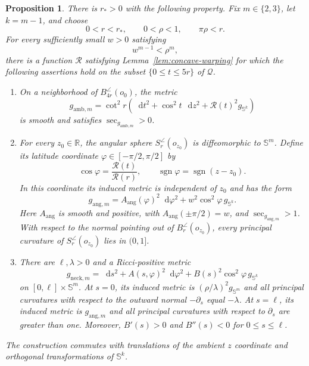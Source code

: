 \documentclass[11pt,reqno]{amsart}
\newtheorem{proposition}[theorem]{Proposition}
\theoremstyle{definition}
\numberwithin{equation}{section}
\DeclareMathOperator{\sgn}{sgn}
\newcommand{\dd}{\mathop{}\!\mathrm d}
\begin{document}
\begin{proposition}
\label{prop:unified-neck}
There is $r_*>0$ with the following property.  Fix
$m\in\{2,3\}$, let $k=m-1$, and choose
\[
             0<r<r_*,\qquad 0<\rho<1,\qquad \pi\rho<r.
\]
For every sufficiently small $w>0$ satisfying
\begin{equation}
w^{m-1}<\rho^m,                            \label{eq:unified-base-3-10}
\end{equation}
there is a function $\mathcal R$ satisfying
Lemma~\ref{lem:concave-warping} for which the following assertions hold
on the subset $\{0\le t\le5r\}$ of $\mathcal Q$.

\begin{enumerate}[label=\textup{(\roman*)}]
\item On a neighborhood of $B_{4r}^{\angle}(o_0)$, the metric
\begin{equation}
g_{\mathrm{amb},m}=\cot^2r\left(
 \dd t^2+\cos^2t\,\dd z^2+\mathcal R(t)^2g_{\mathbb S^k}\right)         \label{eq:unified-base-3-11}
\end{equation}
is smooth and satisfies $\sec_{g_{\mathrm{amb},m}}>0$.

\item For every $z_0\in\mathbb R$, the angular sphere
$S_r^{\angle}(o_{z_0})$ is diffeomorphic to $\mathbb S^m$.  Define its
latitude coordinate $\varphi\in[-\pi/2,\pi/2]$ by
\[
 \cos\varphi=\frac{\mathcal R(t)}{\mathcal R(r)},\qquad
 \sgn\varphi=\sgn(z-z_0).
\]
In this coordinate its induced metric is independent of $z_0$ and has
the form
\begin{equation}
g_{\mathrm{ang},m}=A_{\mathrm{ang}}(\varphi)^2\dd\varphi^2
           +w^2\cos^2\varphi\,g_{\mathbb S^k}.                   \label{eq:unified-base-3-12}
\end{equation}
 Here $A_{\mathrm{ang}}$ is smooth and positive, with
 $A_{\mathrm{ang}}(\pm\pi/2)=w$, and $\sec_{g_{\mathrm{ang},m}}>1$.  With respect to the normal
pointing out of
$B_r^{\angle}(o_{z_0})$, every principal curvature of
$S_r^{\angle}(o_{z_0})$ lies in $(0,1]$.

\item There are $\ell,\lambda>0$ and a Ricci-positive metric
\begin{equation}
g_{\mathrm{neck},m}=\dd s^2+A(s,\varphi)^2\dd\varphi^2
          +B(s)^2\cos^2\varphi\,g_{\mathbb S^k}                 \label{eq:unified-base-3-13}
\end{equation}
on $[0,\ell]\times\mathbb S^m$.  At $s=0$, its induced metric is
$(\rho/\lambda)^2g_{\mathbb S^m}$ and all principal curvatures with
respect to the outward normal $-\partial_s$ equal $-\lambda$.  At
$s=\ell$, its induced metric is $g_{\mathrm{ang},m}$ and all principal curvatures
with respect to $\partial_s$ are greater than one.  Moreover,
$B'(s)>0$ and $B''(s)<0$ for $0\le s\le\ell$.
\end{enumerate}
The construction commutes with translations of the ambient $z$
coordinate and orthogonal transformations of 
$\mathbb S^k$.
\end{proposition}
\end{document}

